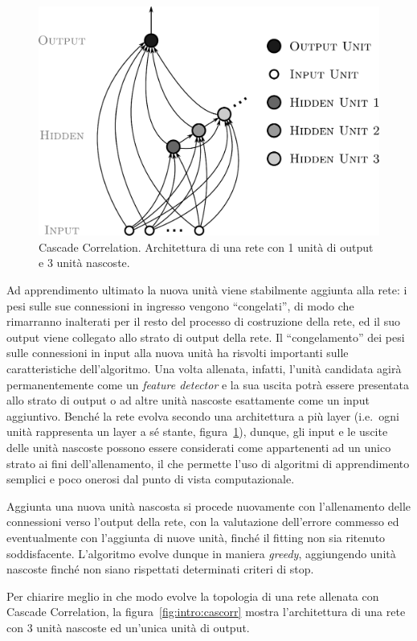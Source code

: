 \begin{figure}[tbp]
\centering
\includegraphics[width=0.6\columnwidth]{img/cascorr}
\medskip
\caption[Cascade Correlation.]{Cascade Correlation. Architettura di una rete con 1 unità di output e 3 unità nascoste.}
\label{fig:intro:cascorr}
\end{figure}

Ad apprendimento ultimato la nuova unità viene stabilmente aggiunta alla rete: i pesi sulle sue connessioni in ingresso vengono ``congelati'', di modo che rimarranno inalterati per il resto del processo di costruzione della rete, ed il suo output viene collegato allo strato di output della rete. Il ``congelamento'' dei pesi sulle connessioni in input alla nuova unità ha risvolti importanti sulle caratteristiche dell'algoritmo. Una volta allenata, infatti, l'unità candidata agirà permanentemente come un \emph{feature detector} e la sua uscita potrà essere presentata allo strato di output o ad altre unità nascoste esattamente come un input aggiuntivo. Benché la rete evolva secondo una architettura a più layer (i.e.\ ogni unità rappresenta un layer a sé stante, figura~\ref{fig:intro:cascorr}), dunque, gli input e le uscite delle unità nascoste possono essere considerati come appartenenti ad un unico strato ai fini dell'allenamento, il che permette l'uso di algoritmi di apprendimento semplici e poco onerosi dal punto di vista computazionale.

Aggiunta una nuova unità nascosta si procede nuovamente con l'allenamento delle connessioni verso l'output della rete, con la valutazione dell'errore commesso ed eventualmente con l'aggiunta di nuove unità, finché il fitting non sia ritenuto soddisfacente. L'algoritmo evolve dunque in maniera \emph{greedy}, aggiungendo unità nascoste finché non siano rispettati determinati criteri di stop.

Per chiarire meglio in che modo evolve la topologia di una rete allenata con Cascade Correlation, la figura~\vref{fig:intro:cascorr} mostra l'architettura di una rete con 3 unità nascoste ed un'unica unità di output.


